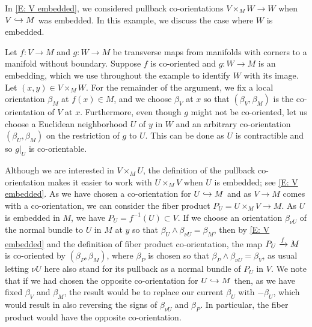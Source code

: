 \begin{example}\label{E: embedded}
	In \cref{E: V embedded}, we considered pullback co-orientations $V \times_M W \to W$ when $V \hookrightarrow M$ was embedded.
	In this example, we discuss the case where $W$ is embedded.

	Let $f \colon V \to M$ and $g \colon W \to M$ be transverse maps from manifolds with corners to a manifold without boundary.
	Suppose $f$ is co-oriented and $g \colon W \to M$ is an embedding, which we use throughout the example to identify $W$ with its image.
	Let $(x,y) \in V \times_M W$.
	For the remainder of the argument, we fix a local orientation $\beta_M$ at $f(x) \in M$, and we choose $\beta_V$ at $x$ so that $(\beta_V,\beta_M)$ is the co-orientation of $V$ at $x$.
	Furthermore, even though $g$ might not be co-oriented, let us choose a Euclidean neighborhood $U$ of $y$ in $W$ and an arbitrary co-orientation $(\beta_U,\beta_M)$ on the restriction of $g$ to $U$.
	This can be done as $U$ is contractible and so $g|_U$ is co-orientable.


	Although we are interested in $V \times_M U$, the definition of the pullback co-orientation makes it easier to work with $U \times_M V$ when $U$ is embedded; see \cref{E: V embedded}.
	As we have chosen a co-orientation for $U \hookrightarrow M$ and as $V \to M$ comes with a co-orientation, we can consider the fiber product $P_U = U \times_M V \to M$.
	As $U$ is embedded in $M$, we have $P_U = f^{-1}(U) \subset V$.
	If we choose an orientation $\beta_{\nu U}$ of the normal bundle to $U$ in $M$ at $y$ so that $\beta_U \wedge \beta_{\nu U} = \beta_M$, then by \cref{E: V embedded} and the definition of fiber product co-orientation, the map $P_U \xrightarrow{f} M$ is co-oriented by $(\beta_P,\beta_M)$, where $\beta_P$ is chosen so that $\beta_P \wedge \beta_{\nu U} = \beta_V$, as usual letting $\nu U$ here also stand for its pullback as a normal bundle of $P_U$ in $V$.
	We note that if we had chosen the opposite co-orientation for $U \hookrightarrow M$ then, as we have fixed $\beta_V$ and $\beta_M$, the result would be to replace our current $\beta_U$ with $-\beta_U$, which would result in also reversing the signs of $\beta_{\nu U}$ and $\beta_P$.
	In particular, the fiber product would have the opposite co-orientation.


\end{example}
